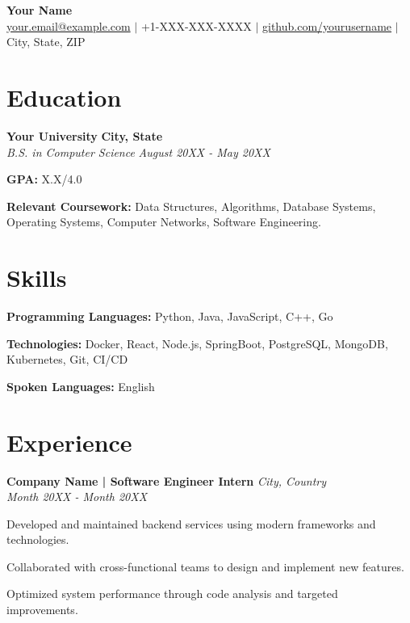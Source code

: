 \documentclass[11pt, a4paper]{article}
\newcommand{\resumeItem}[1]{
  \item\small{
    {#1 \vspace{-2pt}}
  }
}
\newcommand{\resumeSubheading}[4]{
  \textbf{#1} \hfill \small{\textbf{#2}} \\
  \textit{\small#3} \hfill \small{\textit{#4}}
}
\newcommand{\resumeSubheadingItalic}[4]{
  \textbf{#1} \hfill \small{\textit{#2}} \\
  \textit{\small#3} \hfill \small{\textit{#4}}
  \vspace{4pt}
}
\begin{document}
\begin{center}
  {\Large \textbf{Your Name}} \\ \vspace{2pt}
  \small \href{mailto:your.email@example.com}{your.email@example.com} $|$ +1-XXX-XXX-XXXX $|$ \href{https://github.com/yourusername}{github.com/yourusername} $|$ City, State, ZIP
\end{center}

\section{Education}
\vspace{-5pt}
\begin{resumeItemList}
  \item \resumeSubheading
  {Your University}{City, State}
  {B.S. in Computer Science}{August 20XX - May 20XX}
  \vspace{2pt}
  \item \small{\textbf{GPA:} X.X/4.0}
  \item \small{\textbf{Relevant Coursework:} Data Structures, Algorithms, Database Systems, Operating Systems, Computer Networks, Software Engineering.}
\end{resumeItemList}

\section{Skills}
\vspace{-5pt}
\begin{resumeItemList}
  \item \small{\textbf{Programming Languages:} Python, Java, JavaScript, C++, Go}
  \item \small{\textbf{Technologies:} Docker, React, Node.js, SpringBoot, PostgreSQL, MongoDB, Kubernetes, Git, CI/CD}
  \item \small{\textbf{Spoken Languages:} English}
\end{resumeItemList}

\section{Experience}
\vspace{-5pt}
\resumeSubheadingItalic
{Company Name | Software Engineer Intern}{City, Country}
{Month 20XX - Month 20XX}{}
\begin{resumeItemList}
  \resumeItem{Developed and maintained backend services using modern frameworks and technologies.}
  \resumeItem{Collaborated with cross-functional teams to design and implement new features.}
  \resumeItem{Optimized system performance through code analysis and targeted improvements.}
\end{resumeItemList}
\end{document}
